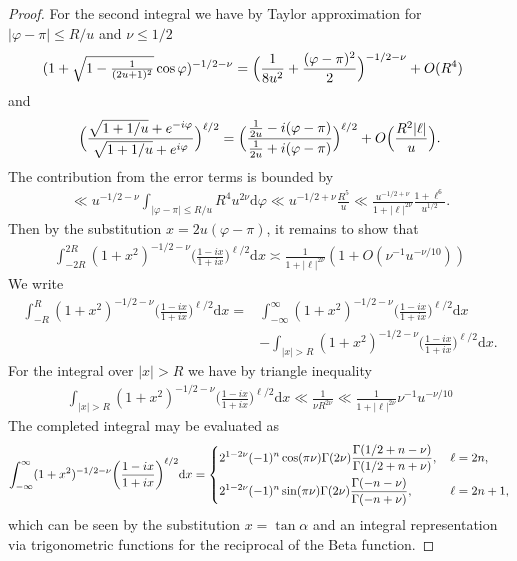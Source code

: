 \documentclass[12pt]{amsart}
\theoremstyle{definition}
\theoremstyle{remark}
\numberwithin{equation}{section}
\newcommand{\1}{{\mathbf 1}}
\renewcommand{\d}{\mathrm d}
\begin{document}
\begin{proof}
For the second integral we have by Taylor approximation for $|\varphi-\pi| \leq R/u$  and $\nu \leq 1/2$
\begin{align*}
  (1+\sqrt{1-\tfrac{1}{(2u+1)^2}} \cos \varphi)^{-1/2-\nu}
 & = \Bigl(\frac{1}{8 u^2} + \frac{(\varphi-\pi)^2}{2}\Bigr)^{-1/2-\nu} + O( R^4 ) 
\end{align*}
and
\begin{align*}
    \Bigl( \frac{\sqrt{1+1/u} + e^{-i\varphi}}{\sqrt{1+1/u} + e^{i\varphi}} \Bigr)^{\ell/2}=\Bigl(\frac{\frac{1}{2u}-i(\varphi-\pi)}{\frac{1}{2u}+i(\varphi-\pi)}\Bigr)^{\ell/2}+O\Bigl(\frac{R^2 |\ell| }{u}\Bigr).
\end{align*}
The contribution from the error terms is bounded by
\begin{align*}
\ll  u^{-1/2-\nu} \int_{|\varphi-\pi| \leq R/u} R^4 u^{2\nu} \d \varphi \ll   u^{-1/2+\nu}  \frac{R^5}{u} \ll \frac{u^{-1/2+\nu}}{1+|\ell|^{2\nu}} \frac{1+\ell^{6}}{u^{1/2}}.
\end{align*}
Then by the substitution $x=2u(\varphi-\pi)$, it remains to show that 
\begin{align*}
   \int_{-2R}^{2R } ( 1+ x^2) ^{-1/2-\nu}\bigg( \frac{1-ix}{1+ix}\bigg)^{\ell/2} \d x \asymp \frac{1}{1+|\ell|^{2\nu}}(1+ O(\nu^{-1} u^{-\nu/10}))
\end{align*}
We write
\begin{align*}
       \int_{-R}^{R} ( 1+ x^2) ^{-1/2-\nu}\bigg( \frac{1-ix}{1+ix}\bigg)^{\ell/2} \d x  =    &\int_{-\infty }^{\infty} ( 1+ x^2) ^{-1/2-\nu}\bigg( \frac{1-ix}{1+ix}\bigg)^{\ell/2} \d x  \\
       &- \int_{|x| > R} ( 1+ x^2) ^{-1/2-\nu}\bigg( \frac{1-ix}{1+ix}\bigg)^{\ell/2} \d x.
\end{align*}
For the integral over $|x| > R$ we have by triangle inequality
\begin{align*}
     \int_{|x| > R} ( 1+ x^2) ^{-1/2-\nu}\bigg( \frac{1-ix}{1+ix}\bigg)^{\ell/2} \d x  \ll  \frac{1}{\nu R^{2\nu}} \ll  \frac{1}{1+|\ell|^{2\nu}}\nu^{-1} u^{-\nu/10}
\end{align*}
The completed integral may be evaluated as
\begin{align*}
    \int_{-\infty }^{\infty} ( 1+ x^2) ^{-1/2-\nu}\bigg( \frac{1-ix}{1+ix}\bigg)^{\ell/2} \d x  = \begin{dcases}
       2^{1-2\nu} (-1)^n  \cos(\pi \nu) \Gamma(2\nu)\frac{\Gamma(1/2+n-\nu)}{\Gamma(1/2+n+\nu)} , \, &\ell=2n, \\
        2^{1-2\nu} (-1)^{n}\sin(\pi\nu) \Gamma(2\nu)\frac{\Gamma(-n-\nu)}{\Gamma(-n+\nu)}, \, &\ell=2n+1,
    \end{dcases}
\end{align*}
which can be seen by the substitution $x= \tan \alpha$ and an integral representation via trigonometric functions for the reciprocal of the Beta function. 
\end{proof}
\end{document}
